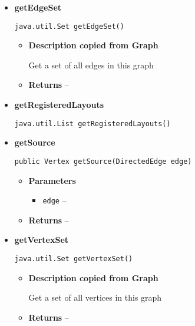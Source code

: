 {{{{{{{{{{{{{{\begin{itemize}
{\begin{itemize}
{}%
\end{itemize}
}%
\item{ 
{\bf  getEdgeSet}\\
\begin{lstlisting}[frame=none]
java.util.Set getEdgeSet()\end{lstlisting} %
\begin{itemize}
\item{
{\bf  Description copied from Graph{\small {}} }

Get a set of all edges in this graph
}
\item{{\bf  Returns} -- 
 
}%
\end{itemize}
}%
\item{ 
{\bf  getRegisteredLayouts}\\
\begin{lstlisting}[frame=none]
java.util.List getRegisteredLayouts()\end{lstlisting} %
}%
\item{ 
{\bf  getSource}\\
\begin{lstlisting}[frame=none]
public Vertex getSource(DirectedEdge edge)\end{lstlisting} %
\begin{itemize}
\item{
{\bf  Parameters}
  \begin{itemize}
   \item{
\texttt{edge} -- }
  \end{itemize}
}%
\item{{\bf  Returns} -- 
 
}%
\end{itemize}
}%
\item{ 
{\bf  getVertexSet}\\
\begin{lstlisting}[frame=none]
java.util.Set getVertexSet()\end{lstlisting} %
\begin{itemize}
\item{
{\bf  Description copied from Graph{\small {}} }

Get a set of all vertices in this graph
}
\item{{\bf  Returns} -- 
 
}
\end{itemize}}
\end{itemize}}}}}}}}}}}}}}}
